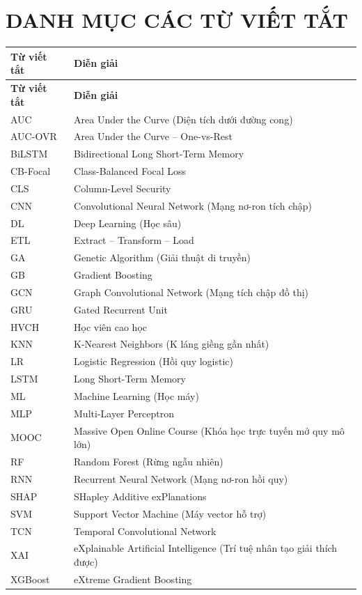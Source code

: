\chapter*{DANH MỤC CÁC TỪ VIẾT TẮT}

\vspace{0.3cm}

\renewcommand{\arraystretch}{1.3}
\begin{longtable}{p{3cm} p{11cm}}
\toprule
\textbf{Từ viết tắt} & \textbf{Diễn giải} \\
\midrule
\endfirsthead
\toprule
\textbf{Từ viết tắt} & \textbf{Diễn giải} \\
\midrule
\endhead
\bottomrule
\endfoot
AUC & Area Under the Curve (Diện tích dưới đường cong) \\
AUC-OVR & Area Under the Curve -- One-vs-Rest \\
BiLSTM & Bidirectional Long Short-Term Memory \\
CB-Focal & Class-Balanced Focal Loss \\
CLS & Column-Level Security \\
CNN & Convolutional Neural Network (Mạng nơ-ron tích chập) \\
DL & Deep Learning (Học sâu) \\
ETL & Extract -- Transform -- Load \\
GA & Genetic Algorithm (Giải thuật di truyền) \\
GB & Gradient Boosting \\
GCN & Graph Convolutional Network (Mạng tích chập đồ thị) \\
GRU & Gated Recurrent Unit \\
HVCH & Học viên cao học \\
KNN & K-Nearest Neighbors (K láng giềng gần nhất) \\
LR & Logistic Regression (Hồi quy logistic) \\
LSTM & Long Short-Term Memory \\
ML & Machine Learning (Học máy) \\
MLP & Multi-Layer Perceptron \\
MOOC & Massive Open Online Course (Khóa học trực tuyến mở quy mô lớn) \\
RF & Random Forest (Rừng ngẫu nhiên) \\
RNN & Recurrent Neural Network (Mạng nơ-ron hồi quy) \\
SHAP & SHapley Additive exPlanations \\
SVM & Support Vector Machine (Máy vector hỗ trợ) \\
TCN & Temporal Convolutional Network \\
XAI & eXplainable Artificial Intelligence (Trí tuệ nhân tạo giải thích được) \\
XGBoost & eXtreme Gradient Boosting \\
\end{longtable}

\clearpage
